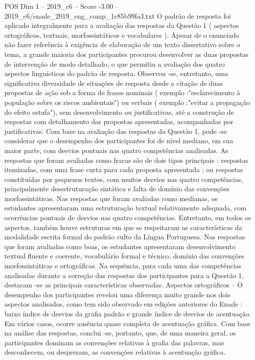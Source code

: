 \begin{textsample}{POS Dim 1 – 2019\_c6 – Score -3.00 – 2019\_c6/enade\_2019\_eng\_comp\_1c85b99fa3.txt}
O padrão de resposta foi aplicado integralmente para a avaliação das respostas da Questão 1 ( aspectos ortográficos, textuais, morfossintáticos e vocabulares ).
Apesar de o enunciado não fazer referência à exigência de elaboração de um texto dissertativo sobre o tema, a grande maioria dos participantes procurou desenvolver as duas propostas de intervenção de modo detalhado, o que permitiu a avaliação dos quatro aspectos linguísticos do padrão de resposta.
Observou -se, entretanto, uma significativa diversidade de situações de resposta desde a citação de duas propostas de ação sob a forma de frases nominais ( exemplo :"esclarecimento à população sobre os riscos ambientais") ou verbais ( exemplo :"evitar a propagação do efeito estufa"), sem desenvolvimento ou justificativas, até a construção de respostas com detalhamento das propostas apresentadas, acompanhadas por justificativas.
Com base na avaliação das respostas da Questão 1, pode -se considerar que o desempenho dos participantes foi de nível mediano, em sua maior parte, com desvios pontuais nas quatro competências analisadas.
As respostas que foram avaliadas como fracas são de dois tipos principais : respostas itemizadas, com uma frase curta para cada proposta apresentada ; ou respostas constituídas por pequenos textos, com muitos desvios nas quatro competências, principalmente desestruturação sintática e falta de domínio das convenções morfossintáticas.
Nas respostas que foram avaliadas como medianas, os estudantes apresentaram uma estruturação textual relativamente adequada, com ocorrências pontuais de desvios nas quatro competências.
Entretanto, em todos os aspectos, também houve estruturas em que se respeitaram as características da modalidade escrita formal do padrão culto da Língua Portuguesa.
Nas respostas que foram avaliadas como boas, os estudantes apresentaram desenvolvimento textual fluente e coerente, vocabulário formal e técnico, domínio das convenções morfossintáticas e ortográficas.
Na sequência, para cada uma das competências analisadas durante a correção das respostas dos participantes para a Questão 1, destacam -se as principais características observadas.
Aspectos ortográficos – O desempenho dos participantes revelou uma diferença muito grande nos dois aspectos analisados, como tem sido observado em edições anteriores do Enade : baixo índice de desvios da grafia padrão e grande índice de desvios de acentuação.
Em vários casos, ocorre ausência quase completa de acentuação gráfica.
Com base na análise das respostas, conclui -se, portanto, que, de uma maneira geral, os participantes dominam as convenções relativas à grafia das palavras, mas desconhecem, ou desprezam, as convenções relativas à acentuação gráfica.

\end{textsample}
